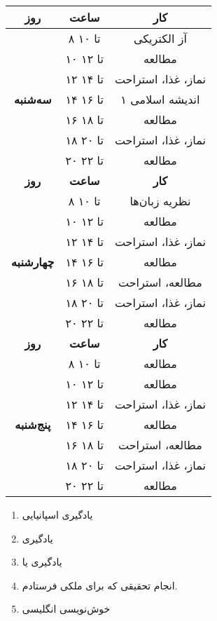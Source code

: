 \documentclass{article}
\begin{document}
\begin{center}
\begin{longtable}{|c|c|c|}
				\textbf{روز} & \textbf{ساعت} & \textbf{کار} \\
				\hline
			
				\multirow{7}{*}{\textbf{سه‌شنبه}} 				
			    & ۸ تا ۱۰ & آز الکتریکی \\
				\cline{2-3}				
				& ۱۰ تا ۱۲ & مطالعه \\
				\cline{2-3}				
				& ۱۲ تا ۱۴ & نماز، غذا، استراحت \\
				\cline{2-3}				
				& ۱۴ تا ۱۶ & اندیشه اسلامی ۱ \\
				\cline{2-3}				
				& ۱۶ تا ۱۸ & مطالعه \\
				\cline{2-3}				
				& ۱۸ تا ۲۰ & نماز، غذا، استراحت \\
				\cline{2-3}				
				& ۲۰ تا ۲۲ & مطالعه \\
		      	\hline
		      	
				\newpage
				
				\hline
				\textbf{روز} & \textbf{ساعت} & \textbf{کار} \\
				\hline
			
				\multirow{7}{*}{\textbf{چهارشنبه}} 				
			    & ۸ تا ۱۰ & نظریه زبان‌ها \\ 
			    \cline{2-3}
			    & ۱۰ تا ۱۲ & مطالعه \\
				\cline{2-3}				
				& ۱۲ تا ۱۴ & نماز، غذا، استراحت \\
				\cline{2-3}				
				& ۱۴ تا ۱۶ & مطالعه \\
				\cline{2-3}				
				& ۱۶ تا ۱۸ & مطالعه، استراحت \\
				\cline{2-3}				
				& ۱۸ تا ۲۰ & نماز، غذا، استراحت \\
				\cline{2-3}				
				& ۲۰ تا ۲۲ & مطالعه \\
				\hline \hline
				
				\textbf{روز} & \textbf{ساعت} & \textbf{کار} \\
				\hline
				
				\multirow{7}{*}{\textbf{پنج‌شنبه}} 				
				& ۸ تا ۱۰ & مطالعه \\ 
				\cline{2-3}
				& ۱۰ تا ۱۲ & مطالعه \\
				\cline{2-3}				
				& ۱۲ تا ۱۴ & نماز، غذا، استراحت \\
				\cline{2-3}				
				& ۱۴ تا ۱۶ & مطالعه \\
				\cline{2-3}				
				& ۱۶ تا ۱۸ & مطالعه، استراحت \\
				\cline{2-3}				
				& ۱۸ تا ۲۰ & نماز، غذا، استراحت \\
				\cline{2-3}				
				& ۲۰ تا ۲۲ & مطالعه \\
				\hline				
	\end{longtable}
\end{center}
\newpage
\begin{enumerate}
	\item 
	یادگیری اسپانیایی
	\item 
	یادگیری 
	\item 
	یادگیری  یا 
	\item 
	انجام تحقیقی که برای ملکی فرستادم.
	\item 
	خوش‌نویسی انگلیسی
\end{enumerate}				
\end{document}
